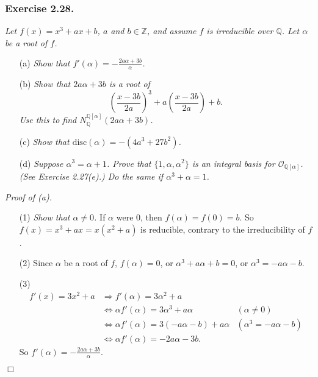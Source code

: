 \documentclass{article}
\begin{document}









\subsubsection*{Exercise 2.28.}
\emph{Let $f(x) = x^3+ax+b$, $a$ and $b \in \mathbb{Z}$,
and assume $f$ is irreducible over $\mathbb{Q}$.
Let $\alpha$ be a root of $f$.}
\begin{enumerate}
\item[(a)]
  \emph{Show that $f'(\alpha) = -\frac{2a\alpha+3b}{\alpha}$.}

\item[(b)]
  \emph{Show that $2a\alpha+3b$ is a root of
  $$\left( \frac{x-3b}{2a} \right)^3 + a\left( \frac{x-3b}{2a} \right) + b.$$
  Use this to find $N_{\mathbb{Q}}^{\mathbb{Q}[\alpha]} (2a\alpha+3b)$.}

\item[(c)]
  \emph{Show that $\textrm{disc}(\alpha) = -(4a^3+27b^2)$.}

\item[(d)]
  \emph{Suppose $\alpha^3=\alpha+1$.
  Prove that $\{1,\alpha,\alpha^2\}$ is an integral basis for $\mathcal{O}_{\mathbb{Q}[\alpha]}$.
  (See Exercise 2.27(e).)
  Do the same if $\alpha^3+\alpha=1$.} \\
\end{enumerate}



\emph{Proof of (a).}
\begin{enumerate}
\item[(1)]
  \emph{Show that $\alpha \neq 0$.}
  If $\alpha$ were $0$, then $f(\alpha) = f(0) = b$.
  So $f(x) = x^3+ax = x(x^2+a)$ is reducible, contrary to the irreducibility of $f$.

\item[(2)]
  Since $\alpha$ be a root of $f$,
  $f(\alpha) = 0$,
  or $\alpha^3 + a\alpha + b = 0$,
  or $\alpha^3 = -a\alpha-b$.

\item[(3)]
  \begin{align*}
    f'(x) = 3x^2 + a
    &\Longrightarrow
    f'(\alpha) = 3\alpha^2 + a \\
    &\Longleftrightarrow
    \alpha f'(\alpha) = 3\alpha^3 + a\alpha
      &(\alpha \neq 0) \\
    &\Longleftrightarrow
    \alpha f'(\alpha) = 3(-a\alpha-b) + a\alpha
      &(\alpha^3 = -a\alpha-b) \\
    &\Longleftrightarrow
    \alpha f'(\alpha) = -2a\alpha-3b.
  \end{align*}
  So $f'(\alpha) = -\frac{2a\alpha+3b}{\alpha}$.
\end{enumerate}
$\Box$ \\
\end{document}
